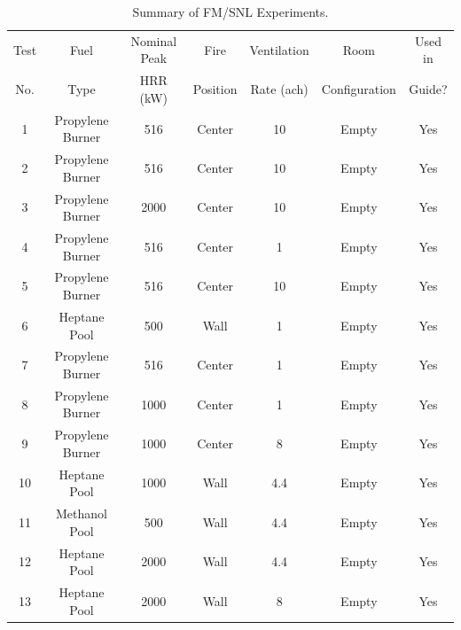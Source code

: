 \begin{table}[h!]
\caption{Summary of FM/SNL Experiments.}
\begin{center}
\begin{tabular}{|c|c|c|c|c|c|c|}
\hline
Test    &  Fuel             & Nominal Peak  & Fire          & Ventilation       & Room                  & Used in  \\
No.     &  Type             & HRR (kW)      & Position      & Rate (ach)        & Configuration         & Guide?      \\ \hline \hline
1       & Propylene Burner  &     516       & Center        & 10                & Empty                 &        Yes \\ \hline
2       & Propylene Burner  &     516       & Center        & 10                & Empty                 &        Yes \\ \hline
3       & Propylene Burner  &    2000       & Center        & 10                & Empty                 &        Yes \\ \hline
4       & Propylene Burner  &     516       & Center        & 1                 & Empty                 &        Yes \\ \hline
5       & Propylene Burner  &     516       & Center        & 10                & Empty                 &        Yes \\ \hline
6       & Heptane Pool      &     500       & Wall          & 1                 & Empty                 &        Yes \\ \hline
7       & Propylene Burner  &     516       & Center        & 1                 & Empty                 &        Yes \\ \hline
8       & Propylene Burner  &    1000       & Center        & 1                 & Empty                 &        Yes \\ \hline
9       & Propylene Burner  &    1000       & Center        & 8                 & Empty                 &        Yes \\ \hline
10      & Heptane Pool      &    1000       & Wall          & 4.4               & Empty                 &        Yes \\ \hline
11      & Methanol Pool     &     500       & Wall          & 4.4               & Empty                 &        Yes \\ \hline
12      & Heptane Pool      &    2000       & Wall          & 4.4               & Empty                 &        Yes \\ \hline
13      & Heptane Pool      &    2000       & Wall          & 8                 & Empty                 &        Yes \\ \hline

\end{tabular}
\end{center}
\end{table}
